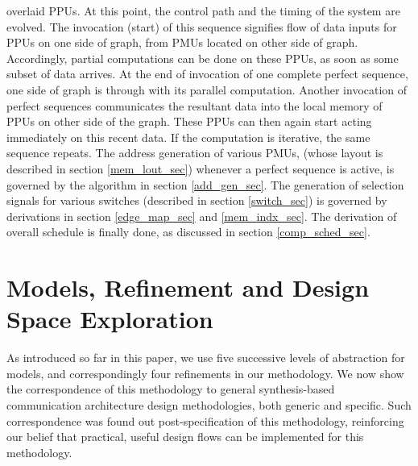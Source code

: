 \documentclass[12pt]{article}
\begin{document}
overlaid PPUs. At this point, the control path and the
timing of the system are evolved. The invocation (start) of this sequence
signifies flow of data inputs for PPUs on one side of graph,
from PMUs located on other side of graph.
Accordingly, partial computations can be done on these
PPUs, as soon as some subset of data arrives. At the end of invocation of
one complete perfect sequence, one side of graph is through with its
parallel computation. Another invocation of perfect sequences communicates
the resultant data into the local memory of PPUs on other side
of the graph. These PPUs can then again start acting
immediately on this recent data. If the computation is iterative, the same
sequence repeats. The address generation of various PMUs,
(whose layout is described in section \ref{mem_lout_sec}) whenever
a perfect sequence is active, is governed by the algorithm in section
\ref{add_gen_sec}. The generation of selection signals for various
switches (described in section \ref{switch_sec}) is governed by
derivations in section \ref{edge_map_sec} and \ref{mem_indx_sec}.
The derivation of overall schedule is finally done, as discussed
in section \ref{comp_sched_sec}.

\section{Models, Refinement and Design Space Exploration}
\label{mod_ref_sec}
As introduced so far in this paper, we use five successive levels of
abstraction for
models, and correspondingly four refinements in our methodology. We now
show the correspondence of this methodology to general synthesis-based
communication architecture design methodologies, both generic and specific.
Such correspondence was found out post-specification of this methodology,
reinforcing our belief that practical, useful design flows can be
implemented for this methodology.
\end{document}
